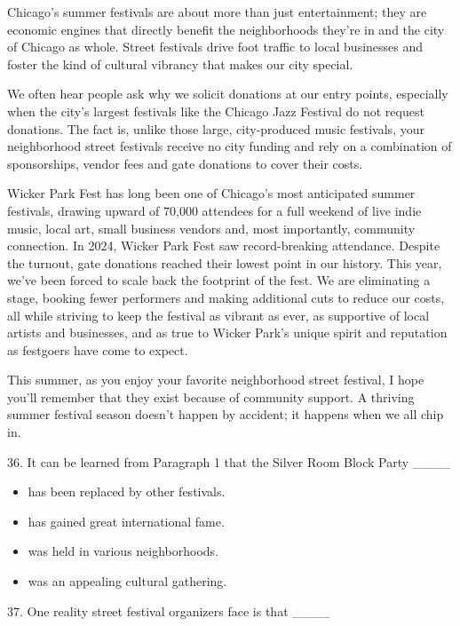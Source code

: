 \documentclass[UTF8,11pt]{ctexart}
\begin{document}
Chicago’s summer festivals are about more than just entertainment; they are economic engines that directly benefit the neighborhoods they’re in and the city of Chicago as whole. Street festivals drive foot traffic to local businesses and foster the kind of cultural vibrancy that makes our city special.


We often hear people ask why we solicit donations at our entry points, especially when the city’s largest festivals like the Chicago Jazz Festival do not request donations. The fact is, unlike those large, city-produced music festivals, your neighborhood street festivals receive no city funding and rely on a combination of sponsorships, vendor fees and gate donations to cover their costs.


Wicker Park Fest has long been one of Chicago’s most anticipated summer festivals, drawing upward of 70,000 attendees for a full weekend of live indie music, local art, small business vendors and, most importantly, community connection. In 2024, Wicker Park Fest saw record-breaking attendance. Despite the turnout, gate donations reached their lowest point in our history. This year, we’ve been forced to scale back the footprint of the fest. We are eliminating a stage, booking fewer performers and making additional cuts to reduce our costs, all while striving to keep the festival as vibrant as ever, as supportive of local artists and businesses, and as true to Wicker Park’s unique spirit and reputation as festgoers have come to expect.


This summer, as you enjoy your favorite neighborhood street festival, I hope you’ll remember that they exist because of community support. A thriving summer festival season doesn’t happen by accident; it happens when we all chip in.


36. It can be learned from Paragraph 1 that the Silver Room Block Party \_\_\_\_


\begin{itemize}[leftmargin=2em,itemsep=.2em,topsep=.4em]\item[A.] has been replaced by other festivals.
\item[B.] has gained great international fame.
\item[C.] was held in various neighborhoods.
\item[D.] was an appealing cultural gathering.
\end{itemize}

37. One reality street festival organizers face is that \_\_\_\_
\end{document}
